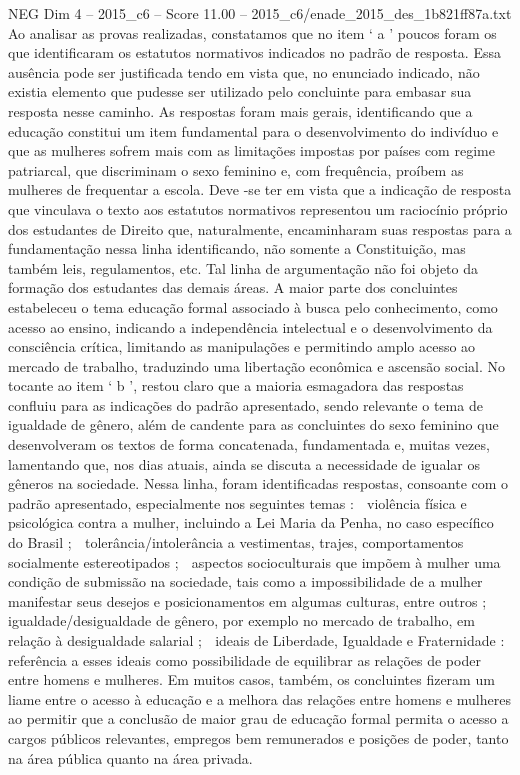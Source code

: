 \begin{textsample}{NEG Dim 4 – 2015\_c6 – Score 11.00 – 2015\_c6/enade\_2015\_des\_1b821ff87a.txt}
Ao analisar as provas realizadas, constatamos que no item ‘ a ’ poucos foram os que identificaram os estatutos normativos indicados no padrão de resposta.
Essa ausência pode ser justificada tendo em vista que, no enunciado indicado, não existia elemento que pudesse ser utilizado pelo concluinte para embasar sua resposta nesse caminho.
As respostas foram mais gerais, identificando que a educação constitui um item fundamental para o desenvolvimento do indivíduo e que as mulheres sofrem mais com as limitações impostas por países com regime patriarcal, que discriminam o sexo feminino e, com frequência, proíbem as mulheres de frequentar a escola.
Deve -se ter em vista que a indicação de resposta que vinculava o texto aos estatutos normativos representou um raciocínio próprio dos estudantes de Direito que, naturalmente, encaminharam suas respostas para a fundamentação nessa linha identificando, não somente a Constituição, mas também leis, regulamentos, etc.
Tal linha de argumentação não foi objeto da formação dos estudantes das demais áreas.
A maior parte dos concluintes estabeleceu o tema educação formal associado à busca pelo conhecimento, como acesso ao ensino, indicando a independência intelectual e o desenvolvimento da consciência crítica, limitando as manipulações e permitindo amplo acesso ao mercado de trabalho, traduzindo uma libertação econômica e ascensão social.
No tocante ao item ‘ b ’, restou claro que a maioria esmagadora das respostas confluiu para as indicações do padrão apresentado, sendo relevante o tema de igualdade de gênero, além de candente para as concluintes do sexo feminino que desenvolveram os textos de forma concatenada, fundamentada e, muitas vezes, lamentando que, nos dias atuais, ainda se discuta a necessidade de igualar os gêneros na sociedade.
Nessa linha, foram identificadas respostas, consoante com o padrão apresentado, especialmente nos seguintes temas :  violência física e psicológica contra a mulher, incluindo a Lei Maria da Penha, no caso específico do Brasil ;  tolerância/intolerância a vestimentas, trajes, comportamentos socialmente estereotipados ;  aspectos socioculturais que impõem à mulher uma condição de submissão na sociedade, tais como a impossibilidade de a mulher manifestar seus desejos e posicionamentos em algumas culturas, entre outros ;  igualdade/desigualdade de gênero, por exemplo no mercado de trabalho, em relação à desigualdade salarial ;  ideais de Liberdade, Igualdade e Fraternidade : referência a esses ideais como possibilidade de equilibrar as relações de poder entre homens e mulheres.
Em muitos casos, também, os concluintes fizeram um liame entre o acesso à educação e a melhora das relações entre homens e mulheres ao permitir que a conclusão de maior grau de educação formal permita o acesso a cargos públicos relevantes, empregos bem remunerados e posições de poder, tanto na área pública quanto na área privada.

\end{textsample}
